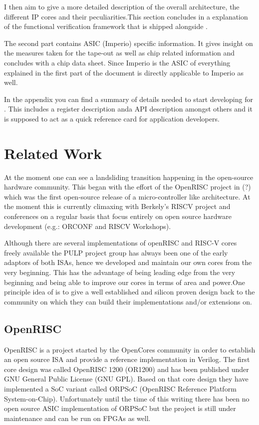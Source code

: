 I then aim to give a more detailed description of the overall architecture, the different IP cores and their peculiarities.This section concludes in a explanation of the functional verification framework that is shipped alongside \pulpino.

The second part contains ASIC (Imperio) specific information. It gives insight on the measures taken for the tape-out as well as chip related information and concludes with a chip data sheet. Since Imperio is the ASIC of \pulpino everything explained in the first part of the document is directly applicable to Imperio as well.

In the appendix you can find a summary of details needed to start developing for \pulpino. This includes a register description anda API description amongst others and it is supposed to act as a quick reference card for application developers.

\section{Related Work}

At the moment one can see a landsliding transition happening in the open-source hardware community. This began with the effort of the OpenRISC project in (?) which was the first open-source release of a micro-controller like architecture.
At the moment this is currently climaxing with Berkely's RISCV project and conferences on a regular basis that focus entirely on open source hardware development (e.g.: ORCONF and RISCV Workshops).

Although there are several implementations of openRISC and RISC-V cores freely available the PULP project group has always been one of the early adaptors of both ISAs, hence we developed and maintain our own cores from the very beginning. This has the advantage of being leading edge from the very beginning and being able to improve our cores in terms of area and power.One principle idea of \pulpino is to give a well established and silicon proven design back to the community on which they can build their implementations and/or extensions on.

\subsection{OpenRISC}

OpenRISC is a project started by the OpenCores community in order to establish an open source ISA and provide a reference implementation in Verilog. The first core design was called OpenRISC 1200 (OR1200) and has been published under GNU General Public License (GNU GPL). Based on that core design they have implemented a SoC variant called ORPSoC (OpenRISC Reference Platform System-on-Chip). Unfortunately until the time of this writing there has been no open source ASIC implementation of ORPSoC but the project is still under maintenance and can be run on FPGAs as well.

